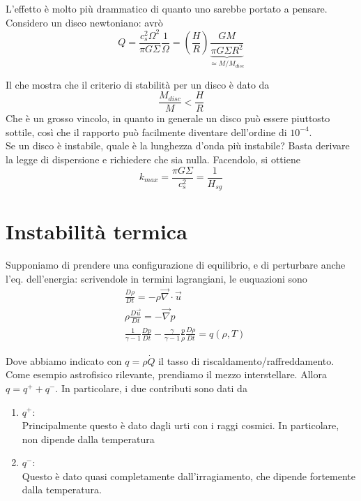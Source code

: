 \documentclass{report}
\begin{document}
L'effetto è molto più drammatico di quanto uno sarebbe portato a pensare. Considero un disco newtoniano: avrò
\begin{equation}
    Q = \frac{c_s^2\Omega^2}{\pi G \Sigma}\frac{1}{\Omega} = \left(\frac{H}{R} \right)\underbrace{\frac{GM}{\pi G\Sigma R^2}}_{\simeq M/M_{disc}}
\end{equation}

Il che mostra che il criterio di stabilità per un disco è dato da 
\begin{equation}
    \frac{M_{disc}}{M} < \frac{H}{R}
\end{equation}
Che è un grosso vincolo, in quanto in generale un disco può essere piuttosto sottile, così che il rapporto può facilmente diventare dell'ordine di $10^{-4}$. \\

Se un disco è instabile, quale è la lunghezza d'onda più instabile? Basta derivare la legge di dispersione e richiedere che sia nulla. Facendolo, si ottiene 
\begin{equation}
    k_{max} = \frac{\pi G \Sigma}{c_s^2} = \frac{1}{H_{sg}}
\end{equation}

\section{Instabilità termica}

Supponiamo di prendere una configurazione di equilibrio, e di perturbare anche l'eq. dell'energia: scrivendole in termini lagrangiani, le euquazioni sono 
\begin{align}
    &\frac{D\rho}{Dt} = -\rho \vec{\nabla}\cdot \vec{u} \\ 
    &\rho \frac{D\vec{u}}{Dt} = -\vec{\nabla}p \\ 
    & \frac{1}{\gamma -1}\frac{Dp}{Dt} - \frac{\gamma}{\gamma-1}\frac{p}{\rho}\frac{D\rho}{Dt} = q(\rho, T)
\end{align}

Dove abbiamo indicato con $q = \rho\dot{Q}$ il tasso di riscaldamento/raffreddamento. Come esempio astrofisico rilevante, prendiamo il mezzo interstellare. Allora $q = q^+ + q^-$. In particolare, i due contributi sono dati da 

\begin{enumerate}
    \item $q^+$: \\
    Principalmente questo è dato dagli urti con i raggi cosmici. In particolare, non dipende dalla temperatura 
    \item $q^-$: \\
    Questo è dato quasi completamente dall'irragiamento, che dipende fortemente dalla temperatura. 
\end{enumerate}
\end{document}
